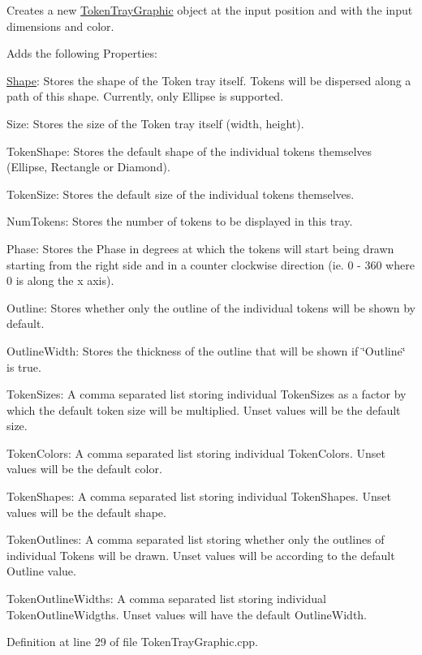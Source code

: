 Creates a new \hyperlink{class_picto_1_1_token_tray_graphic}{Token\-Tray\-Graphic} object at the input position and with the input dimensions and color. 

Adds the following Properties\-:
\begin{DoxyItemize}
\item \hyperlink{class_shape}{Shape}\-: Stores the shape of the Token tray itself. Tokens will be dispersed along a path of this shape. Currently, only Ellipse is supported.
\item Size\-: Stores the size of the Token tray itself (width, height).
\item Token\-Shape\-: Stores the default shape of the individual tokens themselves (Ellipse, Rectangle or Diamond).
\item Token\-Size\-: Stores the default size of the individual tokens themselves.
\item Num\-Tokens\-: Stores the number of tokens to be displayed in this tray.
\item Phase\-: Stores the Phase in degrees at which the tokens will start being drawn starting from the right side and in a counter clockwise direction (ie. 0 -\/ 360 where 0 is along the x axis).
\item Outline\-: Stores whether only the outline of the individual tokens will be shown by default.
\item Outline\-Width\-: Stores the thickness of the outline that will be shown if \char`\"{}\-Outline\char`\"{} is true.
\item Token\-Sizes\-: A comma separated list storing individual Token\-Sizes as a factor by which the default token size will be multiplied. Unset values will be the default size.
\item Token\-Colors\-: A comma separated list storing individual Token\-Colors. Unset values will be the default color.
\item Token\-Shapes\-: A comma separated list storing individual Token\-Shapes. Unset values will be the default shape.
\item Token\-Outlines\-: A comma separated list storing whether only the outlines of individual Tokens will be drawn. Unset values will be according to the default Outline value.
\item Token\-Outline\-Widths\-: A comma separated list storing individual Token\-Outline\-Widgths. Unset values will have the default Outline\-Width. 
\end{DoxyItemize}

Definition at line 29 of file Token\-Tray\-Graphic.\-cpp.



